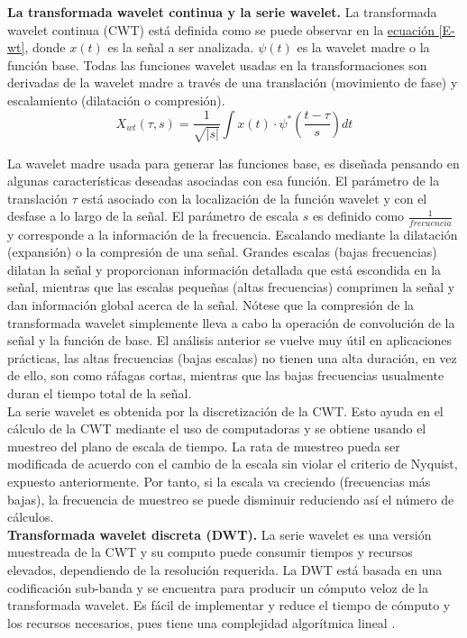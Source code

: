 \documentclass[11pt,lettersize]{article} %
\newcommand{\ecuacion}[1]{\hyperref[{#1}]{ecuación \ref*{#1}}}
\begin{document}
\textbf{La transformada wavelet continua y la serie wavelet.}
La transformada wavelet continua (CWT) está definida como se puede observar en la \ecuacion{E-wt}, donde $x(t)$ es la señal a ser analizada. $\psi(t)$ es la wavelet madre o la función base. Todas las funciones wavelet usadas en la transformaciones son derivadas de la wavelet madre a través de una translación (movimiento de fase) y escalamiento (dilatación o compresión).
\begin{equation}
	X_{wt}(\tau,s) = \dfrac{1}{\sqrt{|s|}}\int x(t)\cdot\psi^{*}\left(\dfrac{t-\tau}{s}\right) dt
	\label{E-wt}
\end{equation}

La wavelet madre usada para generar las funciones base, es diseñada pensando en algunas características deseadas asociadas con esa función. El parámetro de la translación $\tau$ está asociado con la localización de la función wavelet y con el desfase a lo largo de la señal. El parámetro de escala $s$ es definido como $\frac{1}{frecuencia}$ y corresponde a la información de la frecuencia. Escalando mediante la dilatación (expansión) o la compresión de una señal. Grandes escalas (bajas frecuencias) dilatan la señal y proporcionan información detallada que está escondida en la señal, mientras que las escalas pequeñas (altas frecuencias) comprimen la señal y dan información global acerca de la señal. Nótese que la compresión de la transformada wavelet simplemente lleva a cabo la operación de convolución de la señal y la función de base. El análisis anterior se vuelve muy útil en aplicaciones prácticas, las altas frecuencias (bajas escalas) no tienen una alta duración, en vez de ello, son como ráfagas cortas, mientras que las bajas frecuencias usualmente duran el tiempo total de la señal.\\

La serie wavelet es obtenida por la discretización de la CWT. Esto ayuda en el cálculo de la CWT mediante el uso de computadoras y se obtiene usando el muestreo del plano de escala de tiempo. La rata de muestreo pueda ser modificada de acuerdo con el cambio de la escala sin violar el criterio de Nyquist, expuesto anteriormente. Por tanto, si la escala va creciendo (frecuencias más bajas), la frecuencia de muestreo se puede disminuir reduciendo así el número de cálculos.\\

\textbf{Transformada wavelet discreta (DWT).}
La serie wavelet es una versión muestreada de la CWT y su computo puede consumir tiempos y recursos elevados, dependiendo de la resolución requerida. La DWT está basada en una codificación sub-banda y se encuentra para producir un cómputo veloz de la transformada wavelet. Es fácil de implementar y reduce el tiempo de cómputo y los recursos necesarios, pues tiene una complejidad algorítmica lineal \cite{Rioul1992}.\\
\end{document}

